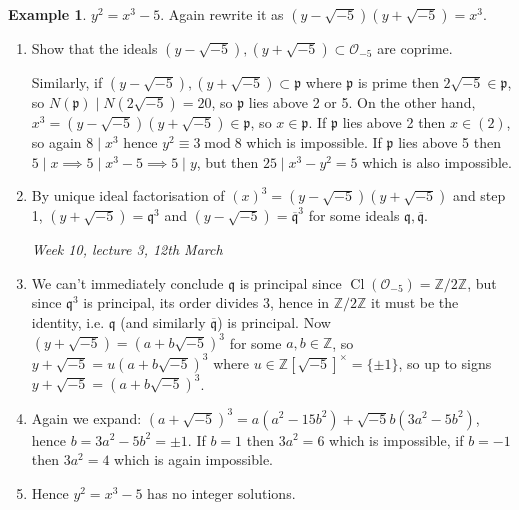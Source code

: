\documentclass{article}
\newcommand{\Z}{\mathbb{Z}}
\newcommand{\Mod}{\operatorname{mod}}
\newcommand{\Cl}{\operatorname{Cl}}
\newcommand{\ri}{\mathcal{O}}
\newcommand{\ip}{\mathfrak{p}}
\newcommand{\iq}{\mathfrak{q}}
\theoremstyle{definition}
\newtheorem{example}[defn]{Example}
\begin{document}
\begin{example}
$y^2=x^3-5$. Again rewrite it as $\left(y-\sqrt{-5}\right)\left(y+\sqrt{-5}\right)=x^3$.
\begin{enumerate}
\item Show that the ideals $\left(y-\sqrt{-5}\right),\left(y+\sqrt{-5}\right)\subset\ri_{-5}$ are coprime.

Similarly, if $\left(y-\sqrt{-5}\right),\left(y+\sqrt{-5}\right)\subset\ip$ where $\ip$ is prime then $2\sqrt{-5}\in\ip$, so $N(\ip)\mid N\left(2\sqrt{-5}\right)=20$, so $\ip$ lies above 2 or 5. On the other hand, $x^3=\left(y-\sqrt{-5}\right)\left(y+\sqrt{-5}\right)\in\ip$, so $x\in\ip$. If $\ip$ lies above 2 then $x\in (2)$, so again $8\mid x^3$ hence $y^2\equiv 3\Mod 8$ which is impossible. If $\ip$ lies above 5 then $5\mid x\implies 5\mid x^3-5\implies 5\mid y$, but then $25\mid x^3-y^2=5$ which is also impossible.
\item By unique ideal factorisation of $(x)^3=\left(y-\sqrt{-5}\right)\left(y+\sqrt{-5}\right)$ and step 1, $\left(y+\sqrt{-5}\right)=\iq^3$ and $\left(y-\sqrt{-5}\right)={\overline{\iq}}^3$ for some ideals $\iq,\overline{\iq}$.

\begin{flushright}
\textit{Week 10, lecture 3, 12th March}
\end{flushright}

\item We can't immediately conclude $\iq$ is principal since $\Cl(\ri_{-5})=\Z/2\Z$, but since $\iq^3$ is principal, its order divides 3, hence in $\Z/2\Z$ it must be the identity, i.e. $\iq$ (and similarly $\overline{\iq}$) is principal. Now $\left(y+\sqrt{-5}\right)=\left(a+b\sqrt{-5}\right)^3$ for some $a,b\in\Z$, so $y+\sqrt{-5}=u\left(a+b\sqrt{-5}\right)^3$ where $u\in\Z\left[\sqrt{-5}\right]^\times=\{\pm 1\}$, so up to signs $y+\sqrt{-5}=\left(a+b\sqrt{-5}\right)^3$.
\item Again we expand: $\left(a+\sqrt{-5}\right)^3=a(a^2-15b^2)+\sqrt{-5}b(3a^2-5b^2)$, hence $b=3a^2-5b^2=\pm 1$. If $b=1$ then $3a^2=6$ which is impossible, if $b=-1$ then $3a^2=4$ which is again impossible.
\item Hence $y^2=x^3-5$ has no integer solutions.
\end{enumerate}
\end{example}
\end{document}
